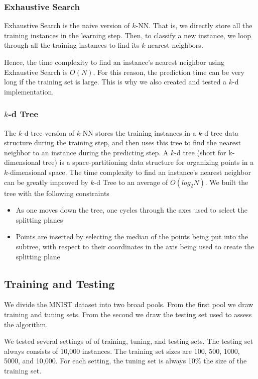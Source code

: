 \subsubsection{Exhaustive Search}
Exhaustive Search is the naive version of $k$-NN. That is, we directly store all the training instances in the learning step. Then, to classify a new instance, we loop through all the training instances to find its $k$ nearest neighbors.

Hence, the time complexity to find an instance's nearest neighbor using Exhaustive Search is $O(N)$. For this reason, the prediction time can be very long if the training set is large. This is why we also created and tested a $k$-d implementation.

\subsubsection{$k$-d Tree}
The $k$-d tree version of $k$-NN stores the training instances in a $k$-d tree data structure during the training step, and then uses this tree to find the nearest neighbor to an instance during the predicting step. A $k$-d tree \cite{bentley1975multidimensional} (short for k-dimensional tree) is a space-partitioning data structure for organizing points in a $k$-dimensional space. The time complexity to find an instance's nearest neighbor can be greatly improved by $k$-d Tree to an average of $O(log_2N)$. We built the tree with the following constraints \cite{de2000computational}
\begin{itemize}
	\item As one moves down the tree, one cycles through the axes used to select the splitting planes
	\item Points are inserted by selecting the median of the points being put into the subtree, with respect to their coordinates in the axis being used to create the splitting plane
\end{itemize}

\subsection{Training and Testing}
We divide the MNIST dataset into two broad pools.  From the first pool we draw training and tuning sets.  From the second we draw the testing set used to assess the algorithm.

We tested several settings of of training, tuning, and testing sets.  The testing set always consists of 10,000 instances.  The training set sizes are 100, 500, 1000, 5000, and 10,000. For each setting, the tuning set is always 10\% the size of the training set.
